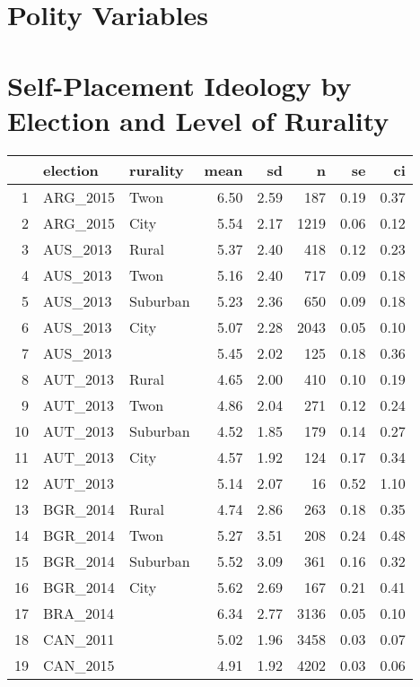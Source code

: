 \documentclass[12pt, titlepage]{article}
\begin{document}
\section{Polity Variables}

\section{Self-Placement Ideology by Election and Level of Rurality}

\begin{table}[ht]
	\centering
	\begin{tabular}{rllrrrrr}
		\hline
		& election & rurality & mean & sd & n & se & ci \\ 
		\hline
		1 & ARG\_2015 & Twon & 6.50 & 2.59 & 187 & 0.19 & 0.37 \\ 
		2 & ARG\_2015 & City & 5.54 & 2.17 & 1219 & 0.06 & 0.12 \\ 
		3 & AUS\_2013 & Rural & 5.37 & 2.40 & 418 & 0.12 & 0.23 \\ 
		4 & AUS\_2013 & Twon & 5.16 & 2.40 & 717 & 0.09 & 0.18 \\ 
		5 & AUS\_2013 & Suburban & 5.23 & 2.36 & 650 & 0.09 & 0.18 \\ 
		6 & AUS\_2013 & City & 5.07 & 2.28 & 2043 & 0.05 & 0.10 \\ 
		7 & AUS\_2013 &  & 5.45 & 2.02 & 125 & 0.18 & 0.36 \\ 
		8 & AUT\_2013 & Rural & 4.65 & 2.00 & 410 & 0.10 & 0.19 \\ 
		9 & AUT\_2013 & Twon & 4.86 & 2.04 & 271 & 0.12 & 0.24 \\ 
		10 & AUT\_2013 & Suburban & 4.52 & 1.85 & 179 & 0.14 & 0.27 \\ 
		11 & AUT\_2013 & City & 4.57 & 1.92 & 124 & 0.17 & 0.34 \\ 
		12 & AUT\_2013 &  & 5.14 & 2.07 &  16 & 0.52 & 1.10 \\ 
		13 & BGR\_2014 & Rural & 4.74 & 2.86 & 263 & 0.18 & 0.35 \\ 
		14 & BGR\_2014 & Twon & 5.27 & 3.51 & 208 & 0.24 & 0.48 \\ 
		15 & BGR\_2014 & Suburban & 5.52 & 3.09 & 361 & 0.16 & 0.32 \\ 
		16 & BGR\_2014 & City & 5.62 & 2.69 & 167 & 0.21 & 0.41 \\ 
		17 & BRA\_2014 &  & 6.34 & 2.77 & 3136 & 0.05 & 0.10 \\ 
		18 & CAN\_2011 &  & 5.02 & 1.96 & 3458 & 0.03 & 0.07 \\ 
		19 & CAN\_2015 &  & 4.91 & 1.92 & 4202 & 0.03 & 0.06 \\ 

\end{tabular}
\end{table}
\end{document}
